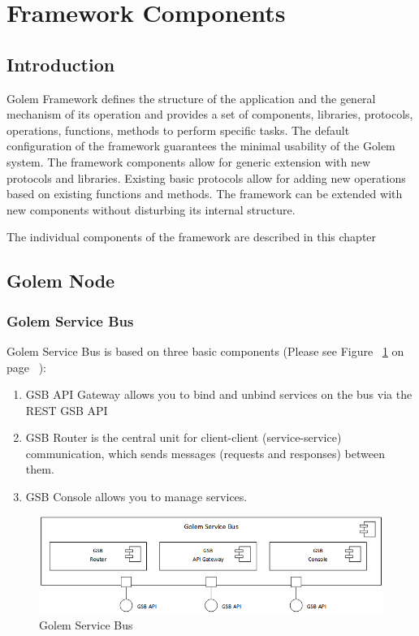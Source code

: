 \section{Framework Components}

\subsection{Introduction}

Golem Framework defines the structure of the application and the general mechanism of its operation
and provides a set of components, libraries, protocols, operations, functions, methods to perform specific tasks.
The default configuration of the framework guarantees the minimal usability of the Golem system.
The framework components allow for generic extension with new protocols and libraries.
Existing basic protocols allow for adding new operations based on existing functions and methods.
The framework can be extended with new components without disturbing its internal structure.

The individual components of the framework are described in this chapter

\subsection{Golem Node}

\subsubsection{Golem Service Bus}

Golem Service Bus is based on three basic components (Please see Figure ~\ref{fig:GSB} on page ~\pageref{fig:GSB}):

\begin{enumerate}

\item GSB API Gateway allows you to bind and unbind services on the bus via the REST GSB API

\item GSB Router is the central unit for client-client (service-service) communication, which sends messages (requests and responses) between them.

\item GSB Console allows you to manage services.

\end{enumerate}

\begin{figure}[H]
    \centering
    \includegraphics[width=12cm,angle=0]{./diag/Reference/GSBConcept-Reference.png}
	\caption{Golem Service Bus}
    \label{fig:GSB}
\end{figure}

